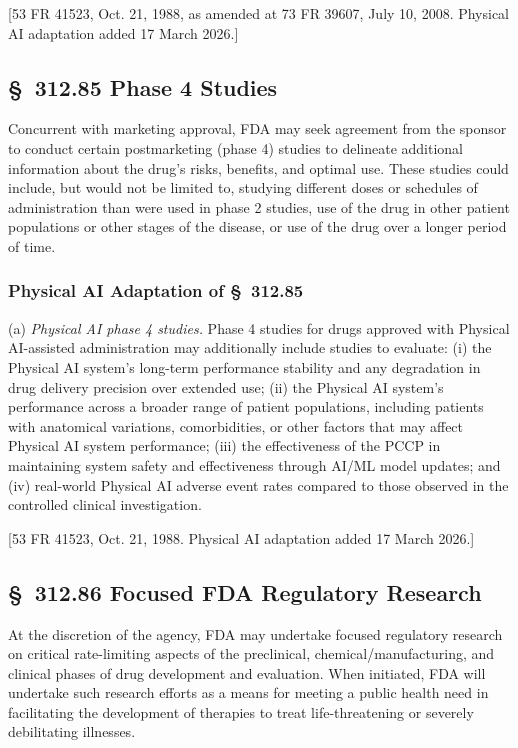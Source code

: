[53 FR 41523, Oct. 21, 1988, as amended at 73 FR 39607, July 10, 2008. Physical AI adaptation added 17 March 2026.]

\subsection{\S~312.85 Phase 4 Studies}

Concurrent with marketing approval, FDA may seek agreement from the sponsor to conduct certain postmarketing (phase 4) studies to delineate additional information about the drug's risks, benefits, and optimal use. These studies could include, but would not be limited to, studying different doses or schedules of administration than were used in phase 2 studies, use of the drug in other patient populations or other stages of the disease, or use of the drug over a longer period of time.

\subsubsection{Physical AI Adaptation of \S~312.85}

(a) \textit{Physical AI phase 4 studies.} Phase 4 studies for drugs approved with Physical AI-assisted administration may additionally include studies to evaluate: (i) the Physical AI system's long-term performance stability and any degradation in drug delivery precision over extended use; (ii) the Physical AI system's performance across a broader range of patient populations, including patients with anatomical variations, comorbidities, or other factors that may affect Physical AI system performance; (iii) the effectiveness of the PCCP in maintaining system safety and effectiveness through AI/ML model updates; and (iv) real-world Physical AI adverse event rates compared to those observed in the controlled clinical investigation.

[53 FR 41523, Oct. 21, 1988. Physical AI adaptation added 17 March 2026.]

\subsection{\S~312.86 Focused FDA Regulatory Research}

At the discretion of the agency, FDA may undertake focused regulatory research on critical rate-limiting aspects of the preclinical, chemical/manufacturing, and clinical phases of drug development and evaluation. When initiated, FDA will undertake such research efforts as a means for meeting a public health need in facilitating the development of therapies to treat life-threatening or severely debilitating illnesses.

